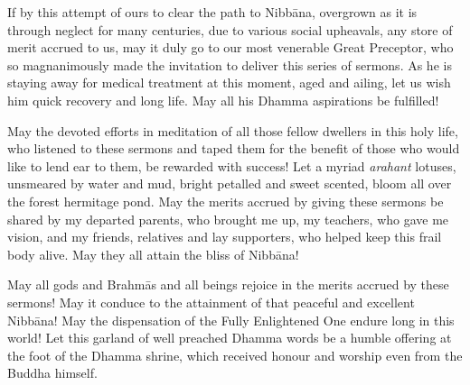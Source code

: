 If by this attempt of ours to clear the path to Nibbāna, overgrown as it is through neglect for many centuries, due to various social upheavals, any store of merit accrued to us, may it duly go to our most venerable Great Preceptor, who so magnanimously made the invitation to deliver this series of sermons. As he is staying away for medical treatment at this moment, aged and ailing, let us wish him quick recovery and long life. May all his Dhamma aspirations be fulfilled!

May the devoted efforts in meditation of all those fellow dwellers in this holy life, who listened to these sermons and taped them for the benefit of those who would like to lend ear to them, be rewarded with success! Let a myriad \emph{arahant} lotuses, unsmeared by water and mud, bright petalled and sweet scented, bloom all over the forest hermitage pond. May the merits accrued by giving these sermons be shared by my departed parents, who brought me up, my teachers, who gave me vision, and my friends, relatives and lay supporters, who helped keep this frail body alive. May they all attain the bliss of Nibbāna!

May all gods and Brahmās and all beings rejoice in the merits accrued by these sermons! May it conduce to the attainment of that peaceful and excellent Nibbāna! May the dispensation of the Fully Enlightened One endure long in this world! Let this garland of well preached Dhamma words be a humble offering at the foot of the Dhamma shrine, which received honour and worship even from the Buddha himself.
